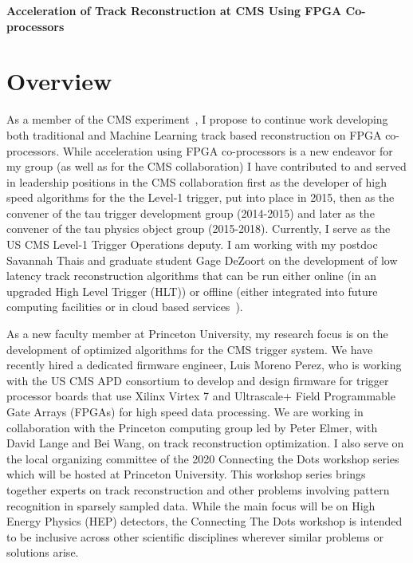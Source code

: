 \documentclass[preprint,12pt]{elsarticle}
\begin{document}





\noindent
\textbf{Acceleration of Track Reconstruction at CMS Using FPGA Co-processors}

\section{Overview}
\label{S:1}
As a member of the CMS experiment~\cite{CMS-JINST}, I propose to continue work developing both
traditional and Machine Learning track based reconstruction on FPGA co-processors.
While acceleration using FPGA co-processors is a new endeavor for my group 
(as well as for the CMS collaboration) I have contributed to and served 
in leadership positions in the CMS collaboration first as the developer of
high speed algorithms for the the Level-1 trigger, put into place in 2015,
then as the convener of the tau trigger development group (2014-2015) 
and later as the convener of the tau physics object group (2015-2018).
Currently, I serve as the US CMS Level-1 Trigger Operations deputy.
I am working with my postdoc Savannah Thais and graduate student Gage DeZoort
on the development of low latency track reconstruction algorithms
that can be run either online (in an upgraded High Level Trigger (HLT)) or offline
(either integrated into future computing facilities or in cloud based services~\cite{Duarte_2019}). 

As a new faculty member at Princeton University, my research focus is 
on the development of optimized algorithms for the CMS trigger system.
We have recently hired a dedicated firmware engineer, Luis Moreno Perez,
who is working with the US CMS APD consortium to develop and design firmware
for trigger processor boards that use Xilinx Virtex 7 and Ultrascale+ 
Field Programmable Gate Arrays (FPGAs) for high speed data processing.
We are working in collaboration with the Princeton computing group led by Peter Elmer,
with David Lange and Bei Wang, on track reconstruction optimization. 
I also serve on the local organizing committee of the 2020 Connecting the Dots 
workshop series which will be hosted at Princeton University. This workshop
series brings together 
experts on track reconstruction and other problems involving pattern recognition 
in sparsely sampled data. While the main focus will be on High Energy Physics (HEP) 
detectors, the Connecting The Dots workshop is intended to be inclusive across other
scientific disciplines wherever similar problems or solutions arise. 
\end{document}

